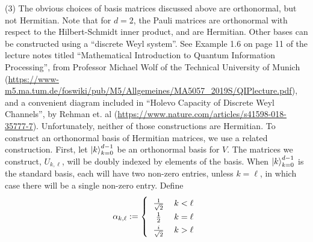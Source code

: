 \noindent(3)  The obvious choices of basis matrices discussed above are orthonormal, but not Hermitian.  Note that for $d=2$, the Pauli matrices are orthonormal with respect to the Hilbert-Schmidt inner product, and are Hermitian.  Other bases can be constructed using a ``discrete Weyl system''.  See Example 1.6 on page 11 of the lecture notes titled ``Mathematical Introduction to Quantum Information Processing'', from Professor Michael Wolf of the Technical University of Munich (\url{https://www-m5.ma.tum.de/foswiki/pub/M5/Allgemeines/MA5057_2019S/QIPlecture.pdf}), and a convenient diagram included in ``Holevo Capacity of Discrete Weyl Channels'', by Rehman et. al (\url{https://www.nature.com/articles/s41598-018-35777-7}).  Unfortunately, neither of those constructions are Hermitian.  To construct an orthonormal basis of Hermitian matrices, we use a related construction.  First, let $\ket{k}_{k=0}^{d-1}$ be an orthonormal basis for $V$.  The matrices we construct, $U_{k,\ell}$, will be doubly indexed by elements of the basis. When $\ket{k}_{k=0}^{d-1}$ is the standard basis, each will have two non-zero entries, unless $k=\ell$, in which case there will be a single non-zero entry.  Define $$\alpha_{k,\ell} := \left\{ \arraycolsep=6pt\def\arraystretch{1.3}\begin{array}{cc} \frac{1}{\sqrt{2}} & k < \ell \\ \frac{1}{2} & k = \ell \\ \frac{i}{\sqrt{2}} &  k > \ell\end{array}\right.$$

